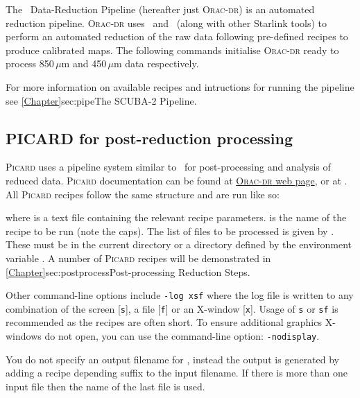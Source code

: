 The \oracdr\ Data-Reduction Pipeline \cite{oracdr} (hereafter just
\textsc{Orac-dr}) is an automated reduction pipeline. \textsc{Orac-dr}
uses \smurf\ and \Kappa\ (along with other Starlink tools) to perform
an automated reduction of the raw data following pre-defined recipes
to produce calibrated maps.  The following commands initialise
\textsc{Orac-dr} ready to process 850\,$\mu$m and 450\,$\mu$m data
respectively.
\begin{terminalv}
\end{terminalv}
For more information on available recipes and intructions for running the pipeline
see \cref{Chapter}{sec:pipe}{The SCUBA-2 Pipeline}.

\subsection{PICARD for post-reduction processing}

\textsc{Picard} uses a pipeline system similar to \oracdr\ for
post-processing and analysis of reduced data. \textsc{Picard}
documentation can be found at
\href{http://www.oracdr.org/oracdr/PICARD}{\textsc{Orac-dr} web page},
or at \picardsun. All \textsc{Picard} recipes follow the same
structure and are run like so:
\begin{terminalv}
\end{terminalv}
where  is a text file containing the
relevant recipe parameters.  is the name of the recipe
to be run (note the caps). The list of files to be processed is given
by  . These must be in the current directory or a
directory defined by the environment variable . A
number of \textsc{Picard} recipes will be demonstrated in
\cref{Chapter}{sec:postprocess}{Post-processing Reduction Steps}.

Other command-line options include \texttt{-log xsf} where the log
file is written to any combination of the screen [\texttt{s}], a file
[\texttt{f}] or an X-window [\texttt{x}].  Usage of \texttt{s} or \texttt{sf} is
recommended as the recipes are often short.
To ensure additional graphics X-windows do not open, you
can use the command-line option: \texttt{-nodisplay}.

You do not specify an output filename for \picard, instead the output
is generated by adding a recipe depending suffix to the input
filename. If there is more than one input file then the name of the
last file is used.

